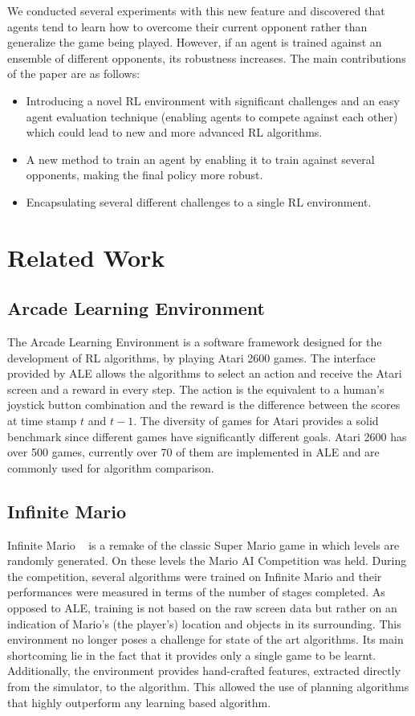 \documentclass{article}
\begin{document}
We conducted several experiments with this new feature and discovered that agents tend to learn how to overcome their current opponent rather than generalize the game being played. 
However, if an agent is trained against an ensemble of different opponents, its robustness increases.
The main contributions of the paper are as follows:
\begin{itemize}
    \item Introducing a novel RL environment with significant challenges and an easy agent evaluation technique (enabling agents to compete against each other) which could lead to new and more advanced RL algorithms.
    \item A new method to train an agent by enabling it to train against several opponents, making the final policy more robust.
    \item Encapsulating several different challenges to a single RL environment.
\end{itemize}

\section{Related Work}
\subsection{Arcade Learning Environment}
The Arcade Learning Environment is a software framework designed for the development of RL algorithms, by playing Atari 2600 games. 
The interface provided by ALE allows the algorithms to select an action and receive the Atari screen and a reward in every step. 
The action is the equivalent to a human's joystick button combination and the reward is the difference between the scores at time stamp $t$ and $t-1$. 
The diversity of games for Atari provides a solid benchmark since different games have significantly different goals.
Atari 2600 has over 500 games, currently over 70 of them are implemented in ALE and are commonly used for algorithm comparison.

\subsection{Infinite Mario}
Infinite Mario ~\citep{togelius2009super} is a remake of the classic Super Mario game in which levels are randomly generated. On these levels the Mario AI Competition was held. During the competition, several algorithms were trained on Infinite Mario and their performances were measured in terms of the number of stages completed. As opposed to ALE, training is not based on the raw screen data but rather on an indication of Mario's (the player's) location and objects in its surrounding. This environment no longer poses a challenge for state of the art algorithms. Its main shortcoming lie in the fact that it provides only a single game to be learnt. Additionally, the environment provides hand-crafted features, extracted directly from the simulator, to the algorithm. This allowed the use of planning algorithms that highly outperform any learning based algorithm.
\end{document}
